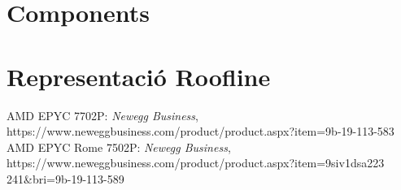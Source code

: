 \documentclass{article}
\begin{document}

\section{Components}

\section{Representació Roofline}

\begin{thebibliography}{}

 AMD EPYC 7702P: \textit{Newegg Business}, \\
https://www.neweggbusiness.com/product/product.aspx?item=9b-19-113-583
 AMD EPYC Rome 7502P: \textit{Newegg Business}, \\ https://www.neweggbusiness.com/product/product.aspx?item=9siv1dsa223\\241\&bri=9b-19-113-589

\end{thebibliography}
\end{document}
